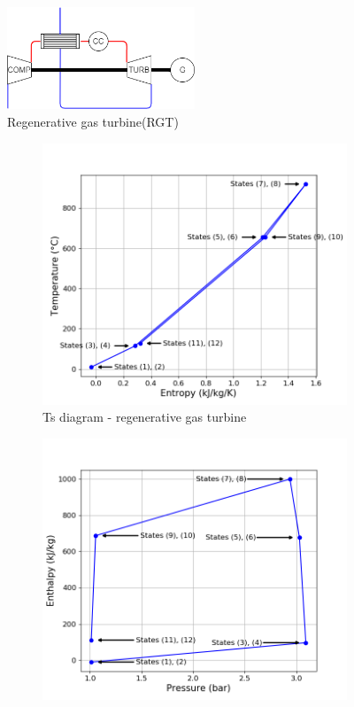 \begin{figure}[h]
\centering
\includegraphics[width=0.5\textwidth]{RGT}
\caption{Regenerative gas turbine(RGT)}
\label{fig:C4_RGT}
\end{figure}
\begin{figure}[h]
     \centering
     \begin{subfigure}[b]{0.4\textwidth}
         \centering
         \includegraphics[width=\textwidth]{Ts_RGT}
         \caption{Ts diagram - regenerative gas turbine}
         \label{fig:C4_Ts_RGT}
     \end{subfigure}
     \begin{subfigure}[b]{0.4\textwidth}
         \centering
         \includegraphics[width=\textwidth]{hp_RGT}

\end{subfigure}
\end{figure}
